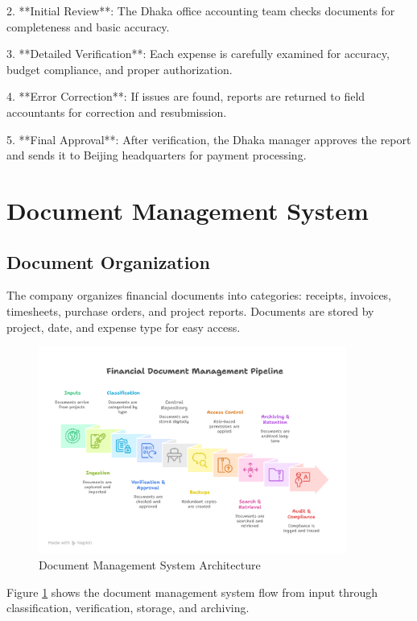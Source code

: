 2. **Initial Review**: The Dhaka office accounting team checks documents for completeness and basic accuracy.

3. **Detailed Verification**: Each expense is carefully examined for accuracy, budget compliance, and proper authorization.

4. **Error Correction**: If issues are found, reports are returned to field accountants for correction and resubmission.

5. **Final Approval**: After verification, the Dhaka manager approves the report and sends it to Beijing headquarters for payment processing.

\section{Document Management System}

\subsection{Document Organization}
The company organizes financial documents into categories: receipts, invoices, timesheets, purchase orders, and project reports. Documents are stored by project, date, and expense type for easy access.

\begin{figure}[H]
    \centering
    \includegraphics[width=0.9\textwidth]{assets/images/document_management.png}
    \caption{Document Management System Architecture}
    \label{fig:document_management}
\end{figure}

Figure \ref{fig:document_management} shows the document management system flow from input through classification, verification, storage, and archiving.

